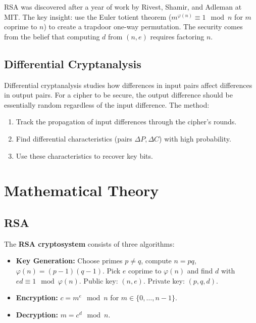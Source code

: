RSA was discovered after a year of work by Rivest, Shamir, and Adleman at MIT. The key insight: use the Euler totient theorem ($m^{\varphi(n)} \equiv 1 \mod n$ for $m$ coprime to $n$) to create a trapdoor one-way permutation. The security comes from the belief that computing $d$ from $(n, e)$ requires factoring $n$.

\subsection{Differential Cryptanalysis}

Differential cryptanalysis studies how differences in input pairs affect differences in output pairs. For a cipher to be secure, the output difference should be essentially random regardless of the input difference. The method:
\begin{enumerate}
    \item Track the propagation of input differences through the cipher's rounds.
    \item Find differential characteristics (pairs $\Delta P, \Delta C$) with high probability.
    \item Use these characteristics to recover key bits.
\end{enumerate}

\section{Mathematical Theory}

\subsection{RSA}

\begin{definition}[RSA]
The \textbf{RSA cryptosystem} consists of three algorithms:
\begin{itemize}
    \item \textbf{Key Generation:} Choose primes $p \neq q$, compute $n = pq$, $\varphi(n) = (p-1)(q-1)$. Pick $e$ coprime to $\varphi(n)$ and find $d$ with $ed \equiv 1 \mod \varphi(n)$. Public key: $(n, e)$. Private key: $(p, q, d)$.
    \item \textbf{Encryption:} $c = m^e \mod n$ for $m \in \{0, \ldots, n-1\}$.
    \item \textbf{Decryption:} $m = c^d \mod n$.
\end{itemize}
\end{definition}


